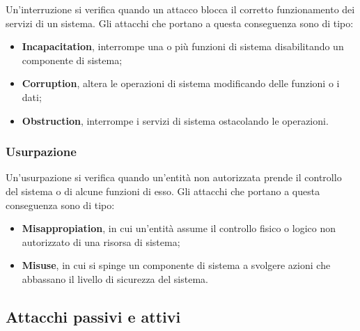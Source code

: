 \documentclass[14pt]{extarticle}
\begin{document}
Un'interruzione si verifica quando un attacco blocca il corretto funzionamento
dei servizi di un sistema. Gli attacchi che portano a questa conseguenza sono di
tipo:
\begin{itemize}
    \item \textbf{Incapacitation}, interrompe una o più funzioni di sistema
    disabilitando un componente di sistema;
    \item \textbf{Corruption}, altera le operazioni di sistema modificando delle
    funzioni o i dati;
    \item \textbf{Obstruction}, interrompe i servizi di sistema ostacolando le
    operazioni.    
\end{itemize}

\subsubsection{Usurpazione}

Un'usurpazione si verifica quando un'entità non autorizzata prende il controllo
del sistema o di alcune funzioni di esso. Gli attacchi che portano a questa
conseguenza sono di tipo:
\begin{itemize}
    \item \textbf{Misappropiation}, in cui un'entità assume il controllo fisico
    o logico non autorizzato di una risorsa di sistema;
    \item \textbf{Misuse}, in cui si spinge un componente di sistema a svolgere
    azioni che abbassano il livello di sicurezza del sistema. 
\end{itemize}

\subsection{Attacchi passivi e attivi}
\end{document}
